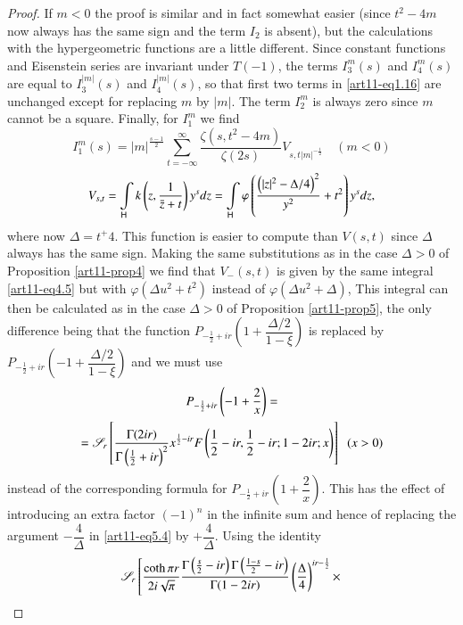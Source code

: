 \begin{proof}
If $m < 0$ the proof is similar and in fact somewhat easier (since $t^2- 4 m$ now always has the same sign and the term $I_2$ is absent), but the calculations with the hypergeometric functions are a little different. Since constant functions and Eisenstein series are invariant under $T(-1)$, the terms $I^m_3 (s)$ and $I^m_4(s)$ are equal to $I^{|m|}_3(s)$ and $I^{|m|}_4(s)$, so that first two terms in \eqref{art11-eq1.16} are unchanged except for replacing $m$ by $|m|$. The term $I^m_2$ is always zero since $m$ cannot be a square. Finally, for $I^m_1$ we find 
\begin{equation*}
I^m_1 (s) = |m|^{\frac{s-1}{2}} \sum\limits^\infty_{t = - \infty} \frac{\zeta(s,t^2 - 4 m)}{\zeta(2s)} V_{s, t |m|^{-\frac{1}{2}}} \quad (m<0)\tag{5.6}
\label{art11-eq5.6}
\end{equation*}
$$
V_{s,t} = \int\limits_{\mathsf{H}} k \left(z, \frac{1}{\bar{z} + t} \right) y^s dz = \int\limits_{\mathsf{H}} \varphi \left(\frac{\left(|z|^2 - \Delta / 4 \right)^2}{y^2} + t^2 \right) y^s dz,
$$
where now $\Delta = t^ +4$. This function is easier to compute than $V(s,t)$ since $\Delta$ always has the same sign. Making the same substitutions as in the case $\Delta >0$ of Proposition \eqref{art11-prop4} we find that $V_-(s,t)$ is given by the same integral \eqref{art11-eq4.5} but with $\varphi (\Delta u^2 + t^2)$ instead of $\varphi (\Delta u^2+ \Delta)$, This integral can then be calculated as in the case $\Delta > 0$ of Proposition \ref{art11-prop5}, the only difference being that the function $P_{-\frac{1}{2} + ir} \left(1+\dfrac{\Delta /2}{1-\xi} \right)$ is replaced by $P_{-\frac{1}{2} + ir} \left(-1 + \dfrac{\Delta /2}{1-\xi}\right)$ and we must use
\begin{multline*}
P_{-\frac{1}{2} + ir} \left(-1 + \frac{2}{x}  \right) =  \\
 = \mathscr{S}_r \left[ \frac{\Gamma (2 ir)}{\Gamma \left(\frac{1}{2} + ir \right)^2} x^{\frac{1}{2} - ir} F \left(\frac{1}{2}  - ir, \frac{1}{2} - ir; 1 - 2 ir; x \right) \right] \;\; (x>0)
\end{multline*}\pageoriginale
[EH 3.2(18)] instead of the corresponding formula for $P_{-\frac{1}{2} + ir} \left(1+ \dfrac{2}{x} \right)$. This has the effect of introducing an extra factor $(-1)^n$ in the infinite sum and hence of replacing the argument $-\dfrac{4}{\Delta}$ in \eqref{art11-eq5.4} by $+ \dfrac{4}{\Delta}$. Using the identity 
\begin{gather*}
\sS_r \left[\frac{\coth \pi r}{2i \sqrt{\pi}}  \frac{\Gamma \left(\frac{s}{2} - ir \right) \Gamma \left(\frac{1-s}{2} - ir \right)}{\Gamma (1 - 2 ir)} \left(\frac{\Delta}{4} \right)^{ir - \frac{1}{2}} \times \right.\\

\end{gather*}
\end{proof}
